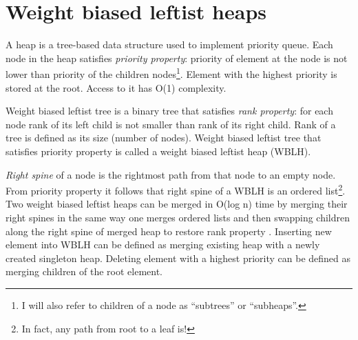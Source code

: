 \section{Weight biased leftist heaps}

A heap is a tree-based data structure used to implement priority queue. Each node in the heap satisfies \textit{priority property}: priority of element at the node is not lower than priority of the children nodes\footnote{I will also refer to children of a node as ``subtrees'' or ``subheaps''.}. Element with the highest priority is stored at the root. Access to it has O(1) complexity.

Weight biased leftist tree \cite{ChoSah96} is a binary tree that satisfies \textit{rank property}: for each node rank of its left child is not smaller than rank of its right child. Rank of a tree is defined as its size (number of nodes). Weight biased leftist tree that satisfies priority property is called a weight biased leftist heap (WBLH).

\textit{Right spine} of a node is the rightmost path from that node to an empty node. From priority property it follows that right spine of a WBLH is an ordered list\footnote{In fact, any path from root to a leaf is!}. Two weight biased leftist heaps can be merged in O(log n) time by merging their right spines in the same way one merges ordered lists and then swapping children along the right spine of merged heap to restore rank property \cite{Oka99}. Inserting new element into WBLH can be defined as merging existing heap with a newly created singleton heap. Deleting element with a highest priority can be defined as merging children of the root element.
